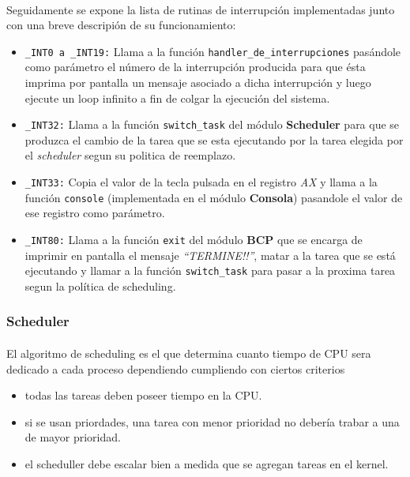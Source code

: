\documentclass[11pt, a4paper]{article}
\begin{document}
	\paragraph{}
	Seguidamente se expone la lista de rutinas de interrupción implementadas junto con una breve descripión de su funcionamiento:
	\begin{itemize}
		\item \texttt{\_INT0 a \_INT19:} Llama a la función \texttt{handler\_de\_interrupciones} pasándole como parámetro el número de la interrupción producida para que ésta imprima por pantalla un mensaje asociado a dicha interrupción y luego ejecute un loop infinito a fin de colgar la ejecución del sistema.
		\item \texttt{\_INT32:} Llama a la función \texttt{switch\_task} del módulo \textbf{Scheduler} para que se produzca el cambio de la tarea que se esta ejecutando por la tarea elegida por el \textit{scheduler} segun su politica de reemplazo.
		\item \texttt{\_INT33:} Copia el valor de la tecla pulsada en el registro \textit{AX} y llama a la función \texttt{console} (implementada en el módulo \textbf{Consola}) pasandole el valor de ese registro como parámetro.
		\item \texttt{\_INT80:} Llama a la función \texttt{exit} del módulo \textbf{BCP} que se encarga de imprimir en pantalla el mensaje \textit{``TERMINE!!''}, matar a la tarea que se está ejecutando y llamar a la función \texttt{switch\_task} para pasar a la proxima tarea segun la política de scheduling. 
	\end{itemize}

\subsubsection{Scheduler}
\label{sched}	
	\paragraph{}
	El algoritmo de scheduling es el que determina cuanto tiempo de CPU sera dedicado a cada proceso dependiendo cumpliendo con ciertos criterios
	\begin{itemize}
		\item todas las tareas deben poseer tiempo en la CPU.
		\item si se usan priordades, una tarea con menor prioridad no debería trabar a una de mayor prioridad.
		\item el scheduller debe escalar bien a medida que se agregan tareas en el kernel.
	\end{itemize}
\end{document}
